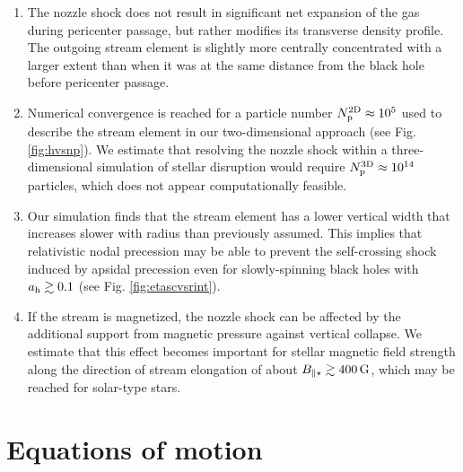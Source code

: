 \documentclass[a4paper,fleqn,usenatbib]{mnras}
\def\gauss{\, \rm G}
\begin{document}
\begin{enumerate}
\item The nozzle shock does not result in significant net expansion of the gas during pericenter passage, but rather modifies its transverse density profile. The outgoing stream element is slightly more centrally concentrated with a larger extent than when it was at the same distance from the black hole before pericenter passage. 

\item Numerical convergence is reached for a particle number $N^{\rm 2D}_{\rm p} \approx 10^5$ used to describe the stream element in our two-dimensional approach (see Fig. \ref{fig:hvsnp}). We estimate that resolving the nozzle shock within a three-dimensional simulation of stellar disruption would require $N^{\rm 3D}_{\rm p} \approx 10^{14}$ particles, which does not appear computationally feasible.

\item Our simulation finds that the stream element has a lower vertical width that increases slower with radius than previously assumed. This implies that relativistic nodal precession may be able to prevent the self-crossing shock induced by apsidal precession even for slowly-spinning black holes with $a_{\rm h} \gtrsim 0.1$ (see Fig. \ref{fig:etascvsrint}).


\item If the stream is magnetized, the nozzle shock can be affected by the additional support from magnetic pressure against vertical collapse. We estimate that this effect becomes important for stellar magnetic field strength along the direction of stream elongation of about $B_{\parallel\star} \gtrsim 400 \gauss$, which may be reached for solar-type stars.


\end{enumerate}



\appendix

\section{Equations of motion}
\label{ap:equations}
\end{document}
